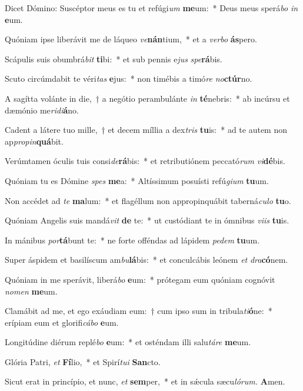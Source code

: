 \item Dicet Dómino: Suscéptor meus es tu et refúgi\textit{um} \textbf{me}um:~* Deus meus sperá\textit{bo} \textit{in} \textbf{e}um.
\item Quóniam ipse liberávit me de láqueo \textit{ve}\textbf{nán}tium,~* et a \textit{verbo} \textbf{ás}pero.
\item Scápulis suis obumbrá\textit{bit} \textbf{ti}bi:~* et sub pennis e\textit{jus} \textit{spe}\textbf{rá}bis.
\item Scuto circúmdabit te véri\textit{tas} \textbf{e}jus:~* non timébis a timó\textit{re} \textit{no}\textbf{ctúr}no.
\item A sagítta volánte in die,~† a negótio perambulánte \textit{in} \textbf{té}nebris:~* ab incúrsu et dæmónio me\textit{ridi}\textbf{á}no.
\item Cadent a látere tuo mille,~† et decem míllia a dex\textit{tris} \textbf{tu}is:~* ad te autem non ap\textit{propin}\textbf{quá}bit.
\item Verúmtamen óculis tuis consi\textit{de}\textbf{rá}bis:~* et retributiónem peccató\textit{rum} \textit{vi}\textbf{dé}bis.
\item Quóniam tu es Dómine \textit{spes} \textbf{me}a:~* Altíssimum posuísti refú\textit{gium} \textbf{tu}um.
\item Non accédet ad \textit{te} \textbf{ma}lum:~* et flagéllum non appropinquábit taberná\textit{culo} \textbf{tu}o.
\item Quóniam Angelis suis mandá\textit{vit} \textbf{de} te:~* ut custódiant te in ómnibus \textit{viis} \textbf{tu}is.
\item In mánibus \textit{por}\textbf{tá}bunt te:~* ne forte offéndas ad lápidem \textit{pedem} \textbf{tu}um.
\item Super áspidem et basilíscum am\textit{bu}\textbf{lá}bis:~* et conculcábis leónem \textit{et} \textit{dra}\textbf{có}nem.
\item Quóniam in me sperávit, liberá\textit{bo} \textbf{e}um:~* prótegam eum quóniam cognóvit \textit{nomen} \textbf{me}um.
\item Clamábit ad me, et ego exáudiam eum:~† cum i\-pso sum in tribula\textit{ti}\textbf{ó}ne:~* erípiam eum et glorifi\textit{cábo} \textbf{e}um.
\item Longitúdine diérum replé\textit{bo} \textbf{e}um:~* et osténdam illi salu\tinyhspace\textit{táre} \textbf{me}um.
\item Glória Patri, \textit{et} \textbf{Fí}lio,~* et Spirí\tinyhspace\textit{tui} \textbf{San}cto.
\item Sicut erat in princípio, et nunc, \textit{et} \textbf{sem}per,~* et in sǽcula sæcu\tinyhspace\textit{lórum.} \textbf{A}men.